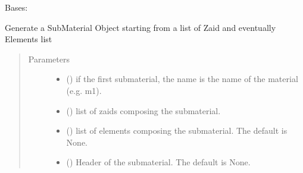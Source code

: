 \documentclass[letterpaper,10pt,english]{sphinxmanual}
\begin{document}
\begin{fulllineitems}
\label{\detokenize{api/inputgeneration:matreader.SubMaterial}}
Bases: 

Generate a SubMaterial Object starting from a list of Zaid and
eventually Elements list
\begin{quote}\begin{description}
\item[{Parameters}] \leavevmode\begin{itemize}
\item {} 
 () \textendash{} if the first submaterial, the name is the name of the material
(e.g. m1).

\item {} 
 (\sphinxstyleliteralemphasis{\sphinxupquote{{[}}}{\hyperref[\detokenize{api/inputgeneration:matreader.Zaid}]{\sphinxcrossref{\sphinxstyleliteralemphasis{\sphinxupquote{Zaid}}}}}\sphinxstyleliteralemphasis{\sphinxupquote{{]}}}) \textendash{} list of zaids composing the submaterial.

\item {} 
 (\sphinxstyleliteralemphasis{\sphinxupquote{{[}}}{\hyperref[\detokenize{api/inputgeneration:matreader.Element}]{\sphinxcrossref{\sphinxstyleliteralemphasis{\sphinxupquote{Element}}}}}\sphinxstyleliteralemphasis{\sphinxupquote{{]}}}\sphinxstyleliteralemphasis{\sphinxupquote{, }}) \textendash{} list of elements composing the submaterial. The default is None.

\item {} 
 (\sphinxstyleliteralemphasis{\sphinxupquote{, }}) \textendash{} Header of the submaterial. The default is None.


\end{itemize}
\end{description}
\end{quote}
\end{fulllineitems}
\end{document}

